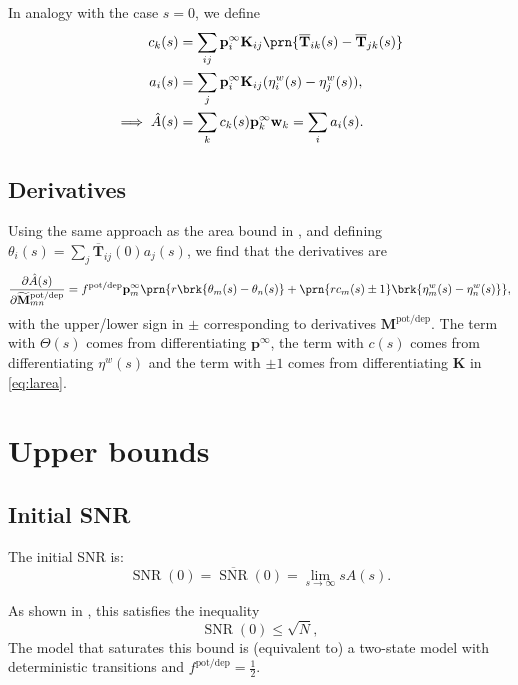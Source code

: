 \documentclass[12pt]{article}
\newcommand{\pr}{\mathbf{p}}
\newcommand{\eq}{\pr^\infty}
\newcommand{\fpt}{\mathbf{T}}
\newcommand{\fptb}{\overline{\fpt}}
\newcommand{\w}{\mathbf{w}}
\newcommand{\M}{\mathbf{M}}
\newcommand{\enc}{\mathbf{K}}
\newcommand{\potdep}{^{\text{pot/dep}}}
\newcommand{\Mh}{\widetilde{\M}}
\DeclareMathOperator{\snr}{SNR}
\newcommand{\snrb}{\overline{\snr}}
\renewcommand{\pdiff}[2]{\frac{\partial #1}{\partial #2}}
\begin{document}
In analogy with the case $s=0$, we define
%
\begin{equation}\label{eq:lareacoeffs}
  \begin{aligned}
    c_k(s) &= \sum_{ij} \eq_i \enc_{ij} \prn{\fptb_{ik}(s)-\fptb_{jk}(s)} \\
    a_i(s) &= \sum_j \eq_i \enc_{ij} (\eta^w_{i}(s) - \eta^w_{j}(s)),\\
    \implies
    \hat{A}(s) &= \sum_k c_k(s) \eq_k \w_k
      = \sum_i a_i(s).
  \end{aligned}
\end{equation}
%

\subsection{Derivatives}\label{sec:lderiv}

Using the same approach as the area bound in \cite{Lahiri2013synapse}, and defining $\theta_i(s) = \sum_j \fptb_{ij}(0) a_j(s)$,  we find that the derivatives are
%
\begin{equation}\label{eq:lAdiff}
  \pdiff{\hat{A}(s)}{\Mh\potdep_{mn}}
     = f\potdep \eq_m \prn{ r \brk{\theta_m(s) - \theta_n(s)}
     +\prn{rc_m(s) \pm 1} \brk{\eta^w_m(s) - \eta^w_n(s)} },
\end{equation}
%
with the upper/lower sign in $\pm$ corresponding to derivatives \wrt $\M\potdep$.
The term with $\Theta(s)$ comes from differentiating $\eq$, the term with $c(s)$ comes from differentiating $\eta^w(s)$ and the term with $\pm1$ comes from differentiating $\enc$ in \eqref{eq:larea}.



\section{Upper bounds}\label{sec:upperbnds}



\subsection{Initial SNR}\label{sec:initial}

The initial SNR is:
%
\begin{equation}\label{eq:initdef}
  \snr(0) = \snrb(0) = \lim_{s\to\infty} sA(s).
\end{equation}
%

As shown in \cite{Lahiri2013synapse}, this satisfies the inequality
%
\begin{equation}\label{eq:initbnd}
  \snr(0) \leq \sqrt{N},
\end{equation}
%
The model that saturates this bound is (equivalent to) a two-state model with deterministic transitions and $f\potdep=\frac{1}{2}$.
\end{document}
